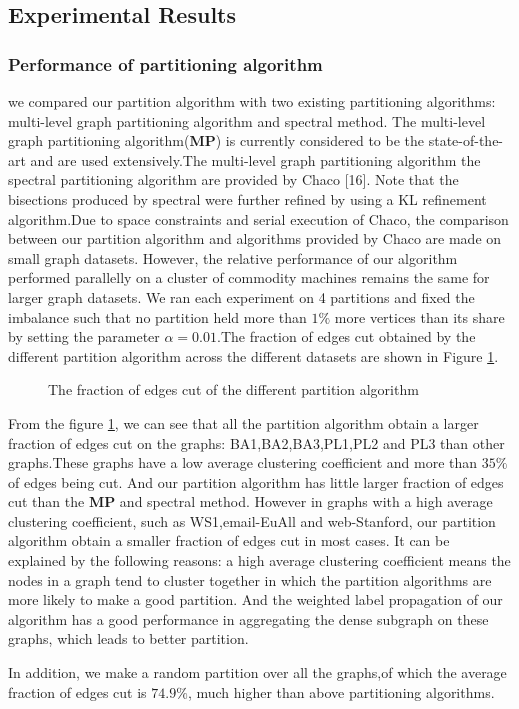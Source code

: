 \documentclass{acm_proc_article-sp}
\begin{document}
\subsection{Experimental Results}
\subsubsection{Performance of partitioning algorithm}
we compared our partition algorithm with two existing partitioning algorithms: multi-level graph partitioning algorithm and spectral method.
The multi-level graph partitioning algorithm(\textbf{MP}) is currently considered to be the state-of-the-art and are used extensively.The multi-level graph partitioning algorithm the spectral partitioning algorithm are provided by Chaco [16]. Note that the bisections produced by spectral were further refined by using a KL refinement algorithm.Due to space constraints and serial execution of Chaco, the comparison between our partition algorithm and algorithms provided by Chaco are made on small graph datasets. However, the relative performance of our algorithm performed parallelly on a cluster of commodity machines remains the same for larger graph datasets. We ran each experiment on 4 partitions and fixed the imbalance such that no partition held more than $1\%$ more vertices than its share by setting the parameter $\alpha=0.01$.The fraction of edges cut obtained by the different partition algorithm across the different datasets  are shown in Figure \ref{fig:per}.
\begin{figure}
\centering
{}
\caption{The fraction of edges cut of the different partition algorithm}
\label{fig:per}
\end{figure}
\par
From the figure \ref{fig:per}, we can see that all the partition algorithm obtain a larger fraction of edges cut on the graphs: BA1,BA2,BA3,PL1,PL2 and PL3 than other graphs.These graphs have a low average clustering coefficient and more than $35\%$ of edges being cut. And our partition algorithm has little larger fraction of edges cut than the \textbf{MP} and spectral method. However in graphs with a high average clustering coefficient, such as WS1,email-EuAll and web-Stanford, our partition algorithm obtain a smaller fraction of edges cut in most cases. It can be explained by the following reasons: a high average clustering coefficient means the nodes in a graph tend to cluster together in which the partition algorithms are more likely to make a good partition. And the weighted label propagation of our algorithm has a good performance in aggregating the dense subgraph on these graphs, which leads to better partition.
\par
In addition, we make a random partition over all the graphs,of which the average fraction of edges cut is $74.9\%$, much higher than above partitioning algorithms.
\end{document}
